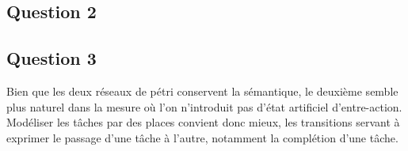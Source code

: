 \subsection*{Question 2}
\subsection*{Question 3}

Bien que les deux réseaux de pétri conservent la sémantique, le
deuxième semble plus naturel dans la mesure où l'on n'introduit pas
d'état artificiel d'entre-action. Modéliser les tâches par des places
convient donc mieux, les transitions servant à exprimer le passage
d'une tâche à l'autre, notamment la complétion d'une tâche.
